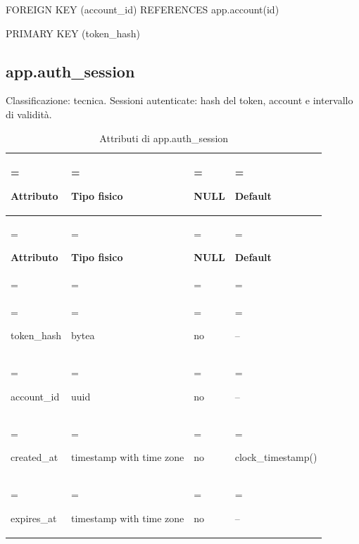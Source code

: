 \documentclass[11pt,a4paper]{article}
\begin{document}
{\ttfamily\small FOREIGN KEY (\allowbreak{}account\_\allowbreak{}id) REFERENCES app.\allowbreak{}account(\allowbreak{}id)}\par

{\ttfamily\small PRIMARY KEY (\allowbreak{}token\_\allowbreak{}hash)}\par

\subsection{app.auth\_session}

Classificazione: tecnica. Sessioni autenticate: hash del token, account e intervallo di validità.

{\small \renewcommand{\arraystretch}{1.2}

\begin{xltabular}{\linewidth}{>{\hsize\linewidth=\hsize\raggedright\arraybackslash}X>{\hsize\linewidth=\hsize\raggedright\arraybackslash}X>{\hsize\linewidth=\hsize\raggedright\arraybackslash}X>{\hsize\linewidth=\hsize\raggedright\arraybackslash}X}
\caption{Attributi di app.auth\_session}\label{tab:dictionary-7}\\
\toprule

\textbf{Attributo} & \textbf{Tipo fisico} & \textbf{NULL} & \textbf{Default}\\\midrule\endfirsthead\toprule\textbf{Attributo} & \textbf{Tipo fisico} & \textbf{NULL} & \textbf{Default}\\\midrule\endhead
\midrule{}\\\endfoot\bottomrule\endlastfoot


{\ttfamily\small token\_\allowbreak{}hash} & {\ttfamily\small bytea} & no & {\ttfamily\small --}\\\addlinespace[3pt]

{\ttfamily\small account\_\allowbreak{}id} & {\ttfamily\small uuid} & no & {\ttfamily\small --}\\\addlinespace[3pt]

{\ttfamily\small created\_\allowbreak{}at} & {\ttfamily\small timestamp with time zone} & no & {\ttfamily\small clock\_\allowbreak{}timestamp(\allowbreak{})}\\\addlinespace[3pt]

{\ttfamily\small expires\_\allowbreak{}at} & {\ttfamily\small timestamp with time zone} & no & {\ttfamily\small --}\\*

\end{xltabular}}
\end{document}
